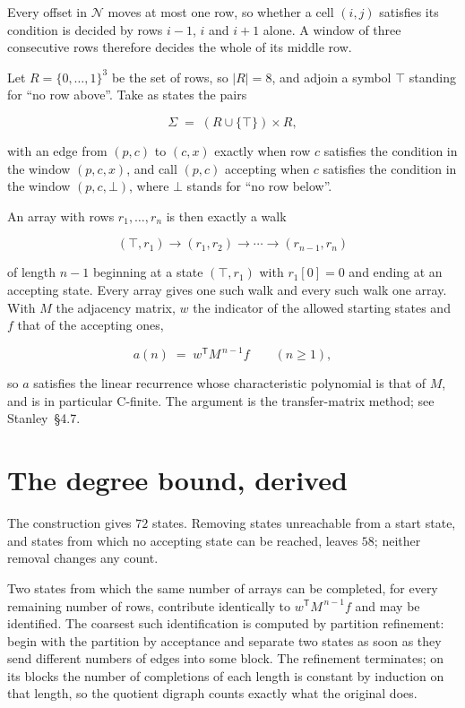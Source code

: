 \documentclass[11pt]{article}
\theoremstyle{definition}
\begin{document}
Every offset in $\mathcal{N}$ moves at most one row, so whether a cell $(i,j)$ satisfies its condition is decided by rows $i-1$, $i$ and $i+1$ alone. A window of three consecutive rows therefore decides the whole of its middle row.

Let $R = \{0,\dots,1\}^{3}$ be the set of rows, so $|R| = 8$, and adjoin a symbol $\top$ standing for ``no row above''. Take as states the pairs

\[\Sigma \;=\; (R \cup \{\top\}) \times R,\]

with an edge from $(p,c)$ to $(c,x)$ exactly when row $c$ satisfies the condition in the window $(p,c,x)$, and call $(p,c)$ accepting when $c$ satisfies the condition in the window $(p,c,\bot)$, where $\bot$ stands for ``no row below''.

An array with rows $r_1,\dots,r_n$ is then exactly a walk

\[(\top,r_1) \to (r_1,r_2) \to \cdots \to (r_{n-1},r_n)\]

of length $n-1$ beginning at a state $(\top,r_1)$ with $r_1[0]=0$ and ending at an accepting state. Every array gives one such walk and every such walk one array. With $M$ the adjacency matrix, $w$ the indicator of the allowed starting states and $f$ that of the accepting ones,

\[a(n) \;=\; w^{\mathsf T} M^{\,n-1} f \qquad (n \ge 1),\]

so $a$ satisfies the linear recurrence whose characteristic polynomial is that of $M$, and is in particular C-finite. The argument is the transfer-matrix method; see Stanley~\S4.7.

\section{The degree bound, derived}

The construction gives $72$ states. Removing states unreachable from a start state, and states from which no accepting state can be reached, leaves $58$; neither removal changes any count.

Two states from which the same number of arrays can be completed, for every remaining number of rows, contribute identically to $w^{\mathsf T}M^{\,n-1}f$ and may be identified. The coarsest such identification is computed by partition refinement: begin with the partition by acceptance and separate two states as soon as they send different numbers of edges into some block. The refinement terminates; on its blocks the number of completions of each length is constant by induction on that length, so the quotient digraph counts exactly what the original does.
\end{document}
